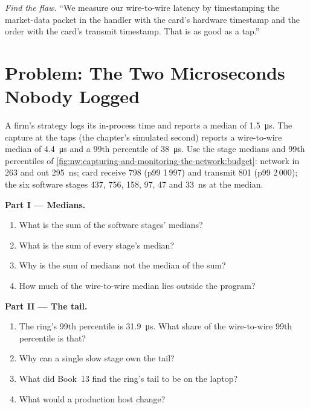 \begin{exercise}[$\star\star\star$]\label{exo:nw:capturing-and-monitoring-the-network:8}
\emph{Find the flaw.} ``We measure our wire-to-wire latency by timestamping the market-data packet in the handler with the card's hardware
timestamp and the order with the card's transmit timestamp. That is as good as a tap.''
\end{exercise}

\section{Problem: The Two Microseconds Nobody Logged}

\begin{problem}\label{pb:nw:capturing-and-monitoring-the-network:1}
A firm's strategy logs its in-process time and reports a median of \qty{1.5}{\micro\second}. The capture at the taps (the chapter's
simulated second) reports a wire-to-wire median of \qty{4.4}{\micro\second} and a 99th percentile of \qty{38}{\micro\second}. Use the stage
medians and 99th percentiles of \cref{fig:nw:capturing-and-monitoring-the-network:budget}: network in 263 and out 295~ns; card receive 798
(p99 1\,997) and transmit 801 (p99 2\,000); the six software stages 437, 756, 158, 97, 47 and 33~ns at the median.

\medskip\noindent\textbf{Part I --- Medians.}
\begin{enumerate}
\item What is the sum of the software stages' medians?
\item What is the sum of every stage's median?
\item Why is the sum of medians not the median of the sum?
\item How much of the wire-to-wire median lies outside the program?
\end{enumerate}

\medskip\noindent\textbf{Part II --- The tail.}
\begin{enumerate}[resume]
\item The ring's 99th percentile is \qty{31.9}{\micro\second}. What share of the wire-to-wire 99th percentile is that?
\item Why can a single slow stage own the tail?
\item What did Book~13 find the ring's tail to be on the laptop?
\item What would a production host change?
\end{enumerate}


\end{problem}
